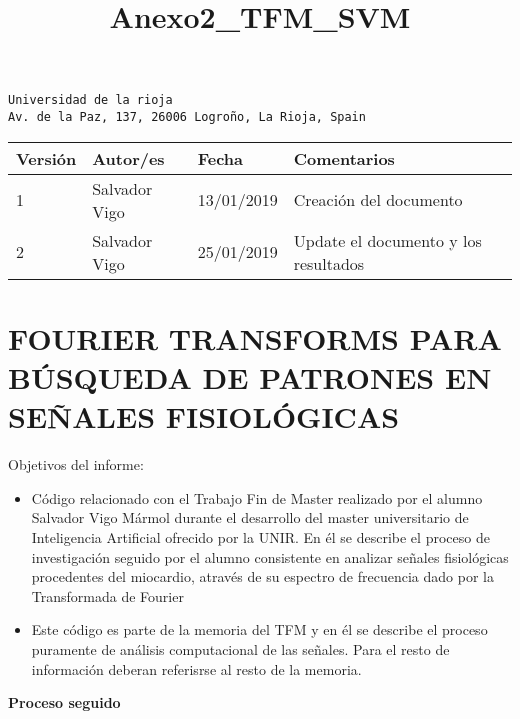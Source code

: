 \documentclass[11pt]{article}
\title{Anexo2\_TFM\_SVM}
\providecommand{\tightlist}{%
      \setlength{\itemsep}{0pt}\setlength{\parskip}{0pt}}
\begin{document}
    
    
    \maketitle
    
    

    
    \begin{verbatim}
Universidad de la rioja
Av. de la Paz, 137, 26006 Logroño, La Rioja, Spain
\end{verbatim}

\begin{longtable}[]{@{}llll@{}}
\toprule
Versión & Autor/es & Fecha & Comentarios\tabularnewline
\midrule
\endhead
1 & Salvador Vigo & 13/01/2019 & Creación del documento\tabularnewline
2 & Salvador Vigo & 25/01/2019 & Update el documento y los
resultados\tabularnewline
\bottomrule
\end{longtable}

\hypertarget{fourier-transforms-para-buxfasqueda-de-patrones-en-seuxf1ales-fisioluxf3gicas}{%
\section{FOURIER TRANSFORMS PARA BÚSQUEDA DE PATRONES EN SEÑALES
FISIOLÓGICAS}\label{fourier-transforms-para-buxfasqueda-de-patrones-en-seuxf1ales-fisioluxf3gicas}}

Objetivos del informe:

\begin{itemize}
\tightlist
\item
  Código relacionado con el Trabajo Fin de Master realizado por el
  alumno Salvador Vigo Mármol durante el desarrollo del master
  universitario de Inteligencia Artificial ofrecido por la UNIR. En él
  se describe el proceso de investigación seguido por el alumno
  consistente en analizar señales fisiológicas procedentes del
  miocardio, através de su espectro de frecuencia dado por la
  Transformada de Fourier
\item
  Este código es parte de la memoria del TFM y en él se describe el
  proceso puramente de análisis computacional de las señales. Para el
  resto de información deberan referisrse al resto de la memoria.
\end{itemize}

\textbf{Proceso seguido}
\end{document}
